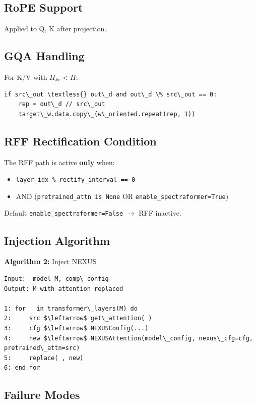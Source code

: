 \subsection{RoPE Support}

Applied to Q, K after projection.

\subsection{GQA Handling}

For K/V with $H_{kv} < H$:

\begin{lstlisting}
if src\_out \textless{} out\_d and out\_d \% src\_out == 0:
    rep = out\_d // src\_out
    target\_w.data.copy\_(w\_oriented.repeat(rep, 1))
\end{lstlisting}

\subsection{RFF Rectification Condition}

The RFF path is active \textbf{only} when:
\begin{itemize}
\item \texttt{layer\_idx \% rectify\_interval == 0}
\item AND (\texttt{pretrained\_attn is None} OR \texttt{enable\_spectraformer=True})

\end{itemize}
Default \texttt{enable\_spectraformer=False} $\to$ RFF inactive.

\subsection{Injection Algorithm}

\textbf{Algorithm 2:} Inject NEXUS
\begin{lstlisting}
Input:  model M, comp\_config
Output: M with attention replaced

1: for   in transformer\_layers(M) do
2:     src $\leftarrow$ get\_attention( )
3:     cfg $\leftarrow$ NEXUSConfig(...)
4:     new $\leftarrow$ NEXUSAttention(model\_config, nexus\_cfg=cfg, pretrained\_attn=src)
5:     replace( , new)
6: end for
\end{lstlisting}

\subsection{Failure Modes}


